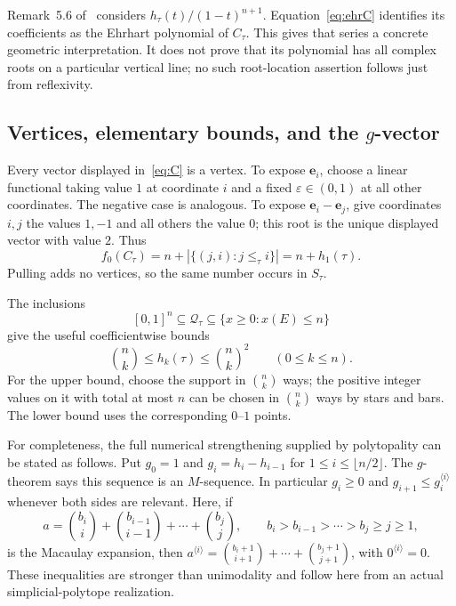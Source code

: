 \documentclass[11pt]{article}
\numberwithin{equation}{section}
\theoremstyle{definition}
\newcommand{\Qt}{\mathcal Q_\tau}
\newcommand{\ee}{\mathbf e}
\begin{document}
Remark~5.6 of~\cite{AC} considers $h_\tau(t)/(1-t)^{n+1}$. Equation~\eqref{eq:ehrC}
identifies its coefficients as the Ehrhart polynomial of $C_\tau$. This gives
that series a concrete geometric interpretation. It does not prove that its
polynomial has all complex roots on a particular vertical line; no such
root-location assertion follows just from reflexivity.

\subsection{Vertices, elementary bounds, and the $g$-vector}

Every vector displayed in~\eqref{eq:C} is a vertex. To expose $\ee_i$, choose
a linear functional taking value $1$ at coordinate $i$ and a fixed
$\varepsilon\in(0,1)$ at all other coordinates. The negative case is analogous.
To expose $\ee_i-\ee_j$, give coordinates $i,j$ the values $1,-1$ and all
others the value $0$; this root is the unique displayed vector with value $2$.
Thus
\begin{equation}
 f_0(C_\tau)=n+|\{(j,i):j\leq_\tau i\}|=n+h_1(\tau).\label{eq:vertices}
\end{equation}
Pulling adds no vertices, so the same number occurs in $S_\tau$.

The inclusions
\[
 [0,1]^n\subseteq\Qt\subseteq\{x\geq0:x(E)\leq n\}
\]
give the useful coefficientwise bounds
\begin{equation}
 \binom nk\leq h_k(\tau)\leq\binom nk^2
 \qquad(0\leq k\leq n).\label{eq:bounds}
\end{equation}
For the upper bound, choose the support in $\binom nk$ ways; the positive
integer values on it with total at most $n$ can be chosen in $\binom nk$ ways
by stars and bars. The lower bound uses the corresponding $0$--$1$ points.

For completeness, the full numerical strengthening supplied by polytopality
can be stated as follows. Put $g_0=1$ and
$g_i=h_i-h_{i-1}$ for $1\leq i\leq\lfloor n/2\rfloor$.
The $g$-theorem says this sequence is an $M$-sequence. In particular
$g_i\geq0$ and $g_{i+1}\leq g_i^{\langle i\rangle}$ whenever both sides
are relevant. Here, if
\[
 a=\binom{b_i}{i}+\binom{b_{i-1}}{i-1}+\cdots+\binom{b_j}{j},
 \qquad b_i>b_{i-1}>\cdots>b_j\geq j\geq1,
\]
is the Macaulay expansion, then
$a^{\langle i\rangle}=\binom{b_i+1}{i+1}+\cdots+\binom{b_j+1}{j+1}$,
with $0^{\langle i\rangle}=0$. These inequalities are stronger than
unimodality and follow here from an actual simplicial-polytope realization.
\end{document}
